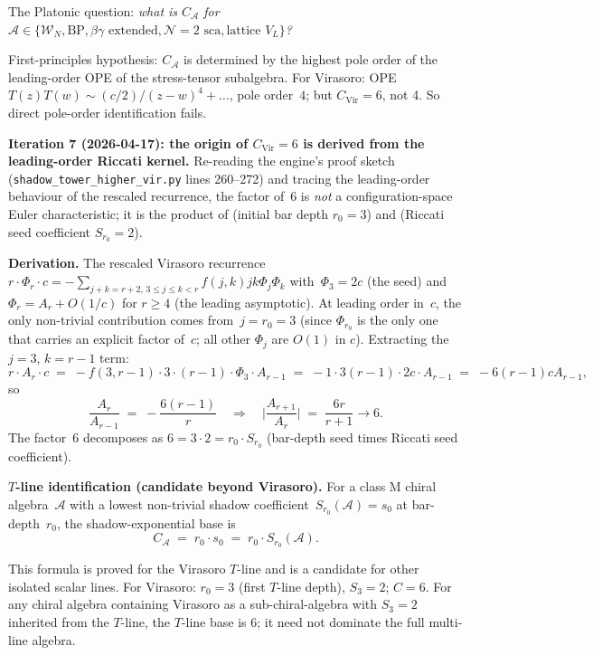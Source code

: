 \documentclass[11pt]{article}
\newcommand{\cA}{\mathcal{A}}
\newcommand{\cW}{\mathcal{W}}
\begin{document}
The Platonic question: \emph{what is $C_{\cA}$ for
$\cA \in \{\cW_N, \mathrm{BP}, \beta\gamma\text{ extended},
\mathcal{N}=2 \text{ sca}, \text{lattice } V_L\}$?}

First-principles hypothesis: $C_{\cA}$ is determined by the highest
pole order of the leading-order OPE of the stress-tensor subalgebra.
For Virasoro: OPE $T(z)T(w) \sim (c/2)/(z-w)^4 + \ldots$, pole
order~$4$; but $C_{\mathrm{Vir}} = 6$, not 4. So direct pole-order
identification fails.

\textbf{Iteration 7 (2026-04-17): the origin of $C_{\mathrm{Vir}}=6$
is derived from the leading-order Riccati kernel.} Re-reading the
engine's proof sketch (\verb|shadow_tower_higher_vir.py| lines
260--272) and tracing the leading-order behaviour of the rescaled
recurrence, the factor of~$6$ is \emph{not} a configuration-space
Euler characteristic; it is the product of (initial bar depth
$r_0 = 3$) and (Riccati seed coefficient $S_{r_0}=2$).

\textbf{Derivation.} The rescaled Virasoro recurrence
$r \cdot \Phi_r \cdot c = -\sum_{j+k=r+2,\,3\le j\le k<r}
f(j,k) j k \Phi_j \Phi_k$ with~$\Phi_3 = 2c$ (the seed) and
$\Phi_r = A_r + O(1/c)$ for $r \ge 4$ (the leading asymptotic).
At leading order in~$c$, the only non-trivial contribution comes
from~$j = r_0 = 3$ (since $\Phi_{r_0}$ is the only one that carries
an explicit factor of~$c$; all other $\Phi_j$ are $O(1)$ in $c$).
Extracting the $j = 3$, $k = r-1$ term:
\[
  r \cdot A_r \cdot c
  \;=\; -f(3, r-1) \cdot 3 \cdot (r-1) \cdot \Phi_3 \cdot A_{r-1}
  \;=\; -1 \cdot 3(r-1) \cdot 2c \cdot A_{r-1}
  \;=\; -6(r-1) c A_{r-1},
\]
so
\[
  \frac{A_r}{A_{r-1}} \;=\; -\frac{6(r-1)}{r}
  \quad\Longrightarrow\quad
  \biggl|\frac{A_{r+1}}{A_r}\biggr| \;=\; \frac{6r}{r+1} \to 6.
\]
The factor~$6$ decomposes as $6 = 3 \cdot 2 = r_0 \cdot S_{r_0}$
(bar-depth seed times Riccati seed coefficient).

\textbf{$T$-line identification (candidate beyond Virasoro).}
For a class M chiral algebra~$\cA$ with a lowest non-trivial shadow
coefficient~$S_{r_0}(\cA) = s_0$ at bar-depth~$r_0$, the
shadow-exponential base is
\[
  C_\cA \;=\; r_0 \cdot s_0 \;=\; r_0 \cdot S_{r_0}(\cA).
\]

This formula is proved for the Virasoro $T$-line and is a candidate
for other isolated scalar lines.  For Virasoro: $r_0 = 3$ (first
$T$-line depth), $S_3 = 2$; $C = 6$.
For any chiral algebra containing Virasoro as a sub-chiral-algebra
with $S_3 = 2$ inherited from the $T$-line, the $T$-line base is
$6$; it need not dominate the full multi-line algebra.
\end{document}
